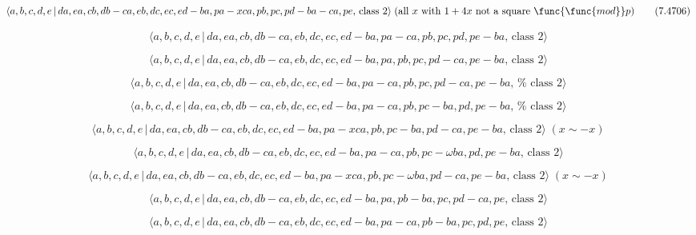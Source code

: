 \documentclass[10pt]{article}
\begin{document}
\begin{equation}
\langle
a,b,c,d,e\,|\,da,ea,cb,db-ca,eb,dc,ec,ed-ba,pa-xca,pb,pc,pd-ba-ca,pe,\,\text{%
class }2\rangle \;(\text{all }x\text{ with }1+4x\text{ not a square }\func{%
\func{mod}}p)  \tag{7.4706}
\end{equation}

\begin{equation}
\langle a,b,c,d,e\,|\,da,ea,cb,db-ca,eb,dc,ec,ed-ba,pa-ca,pb,pc,pd,pe-ba,\,%
\text{class }2\rangle  \tag{7.4707}
\end{equation}

\begin{equation}
\langle a,b,c,d,e\,|\,da,ea,cb,db-ca,eb,dc,ec,ed-ba,pa,pb,pc,pd-ca,pe-ba,\,%
\text{class }2\rangle  \tag{7.4708}
\end{equation}

\begin{equation}
\langle
a,b,c,d,e\,|\,da,ea,cb,db-ca,eb,dc,ec,ed-ba,pa-ca,pb,pc,pd-ca,pe-ba,\,\text{%
class }2\rangle  \tag{7.4709}
\end{equation}

\begin{equation}
\langle
a,b,c,d,e\,|\,da,ea,cb,db-ca,eb,dc,ec,ed-ba,pa-ca,pb,pc-ba,pd,pe-ba,\,\text{%
class }2\rangle  \tag{7.4710}
\end{equation}

\begin{equation}
\langle
a,b,c,d,e\,|\,da,ea,cb,db-ca,eb,dc,ec,ed-ba,pa-xca,pb,pc-ba,pd-ca,pe-ba,\,%
\text{class }2\rangle \;(x \sim -x)  \tag{7.4711}
\end{equation}

\begin{equation}
\langle a,b,c,d,e\,|\,da,ea,cb,db-ca,eb,dc,ec,ed-ba,pa-ca,pb,pc-\omega
ba,pd,pe-ba,\,\text{class }2\rangle  \tag{7.4712}
\end{equation}

\begin{equation}
\langle a,b,c,d,e\,|\,da,ea,cb,db-ca,eb,dc,ec,ed-ba,pa-xca,pb,pc-\omega
ba,pd-ca,pe-ba,\,\text{class }2\rangle \;(x\sim -x)  \tag{7.4713}
\end{equation}

\begin{equation}
\langle a,b,c,d,e\,|\,da,ea,cb,db-ca,eb,dc,ec,ed-ba,pa,pb-ba,pc,pd-ca,pe,\,%
\text{class }2\rangle  \tag{7.4714}
\end{equation}

\begin{equation}
\langle a,b,c,d,e\,|\,da,ea,cb,db-ca,eb,dc,ec,ed-ba,pa-ca,pb-ba,pc,pd,pe,\,%
\text{class }2\rangle  \tag{7.4715}
\end{equation}
\end{document}
